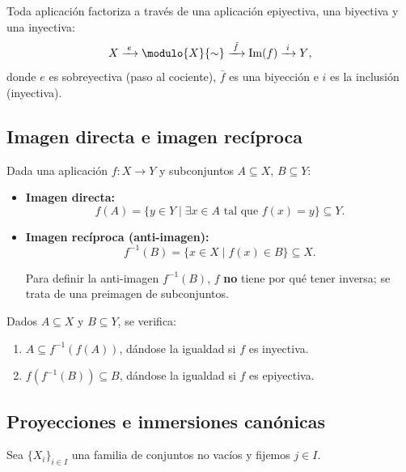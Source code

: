 \begin{propi}
Toda aplicación factoriza a través de una aplicación epiyectiva, una biyectiva y una inyectiva:
$$
    X \xrightarrow{\;e\;} \modulo{X}{\sim} \xrightarrow{\;\bar{f}\;} \operatorname{Im}(f) \xrightarrow{\;i\;} Y \text{},
$$
donde $e$ es sobreyectiva (paso al cociente), $\bar{f}$ es una biyección e $i$ es la inclusión (inyectiva).
\end{propi}

\subsection*{Imagen directa e imagen recíproca}
Dada una aplicación $f \colon X \to Y$ y subconjuntos $A \subseteq X$, $B \subseteq Y$:
\begin{itemize}
    \item \textbf{Imagen directa:}
    $$
        f(A) = \{y \in Y \mid \exists x \in A \text{ tal que } f(x) = y\} \subseteq Y \text{}.
    $$
    \item \textbf{Imagen recíproca (anti-imagen):}
    $$
        f^{-1}(B) = \{x \in X \mid f(x) \in B\} \subseteq X \text{}.
    $$
    \begin{obs}
        Para definir la anti-imagen $f^{-1}(B)$, $f$ \textbf{no} tiene por qué tener inversa; se trata de una preimagen de subconjuntos.
    \end{obs}
\end{itemize}

\begin{propi}
Dados $A \subseteq X$ y $B \subseteq Y$, se verifica:
\begin{enumerate}
    \item $A \subseteq f^{-1}(f(A))$, dándose la igualdad si $f$ es inyectiva.
    \item $f(f^{-1}(B)) \subseteq B$, dándose la igualdad si $f$ es epiyectiva.
\end{enumerate}
\end{propi}

\subsection*{Proyecciones e inmersiones canónicas}
Sea $\{X_i\}_{i \in I}$ una familia de conjuntos no vacíos y fijemos $j \in I$.

